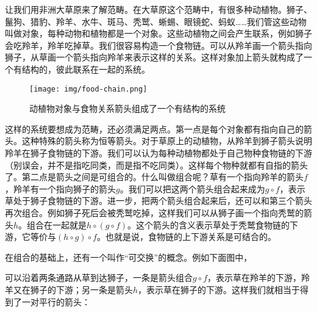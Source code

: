 \documentclass{article}
\begin{document}
让我们用非洲大草原来了解范畴。在大草原这个范畴中，有很多种动植物。狮子、鬣狗、猎豹、羚羊、水牛、斑马、秃鹫、蜥蜴、眼镜蛇、蚂蚁……我们管这些动物叫做对象，每种动物和植物都是一个对象。这些动植物之间会产生联系，例如狮子会吃羚羊，羚羊吃掉草。我们很容易构造一个食物链。可以从羚羊画一个箭头指向狮子，从草画一个箭头指向羚羊来表示这样的关系。这样对象加上箭头就构成了一个有结构的，彼此联系在一起的系统。

\begin{figure}[htbp]
 \centering
 \texttt{[image: img/food-chain.png]}
 \caption{动植物对象与食物关系箭头组成了一个有结构的系统}
 \label{fig:food-chain}
\end{figure}

这样的系统要想成为范畴，还必须满足两点。第一点是每个对象都有指向自己的箭头。这种特殊的箭头称为恒等箭头。对于草原上的动植物，从羚羊到狮子箭头说明羚羊在狮子食物链的下游。我们可以认为每种动植物都处于自己物种食物链的下游（别误会，并不是指吃同类，而是指不吃同类）。这样每个物种就都有自指的箭头了。第二点是箭头之间是可组合的。什么叫做组合呢？草有一个指向羚羊的箭头$f$，羚羊有一个指向狮子的箭头$g$。我们可以把这两个箭头组合起来成为$g \circ f$，表示草处于狮子食物链的下游。进一步，把两个箭头组合起来后，还可以和第三个箭头再次组合。例如狮子死后会被秃鹫吃掉，这样我们可以从狮子画一个指向秃鹫的箭头$h$。组合在一起就是$h \circ (g \circ f)$。这个箭头的含义表示草处于秃鹫食物链的下游，它等价与$(h \circ g) \circ f$。也就是说，食物链的上下游关系是可结合的。

在组合的基础上，还有一个叫作“可交换”的概念。例如下面图中，

\begin{center}
\end{center}

可以沿着两条通路从草到达狮子，一条是箭头组合$g \circ f$，表示草在羚羊的下游，羚羊又在狮子的下游；另一条是箭头$h$，表示草在狮子的下游。这样我们就相当于得到了一对平行的箭头：

\begin{center}
\end{center}
\end{document}
